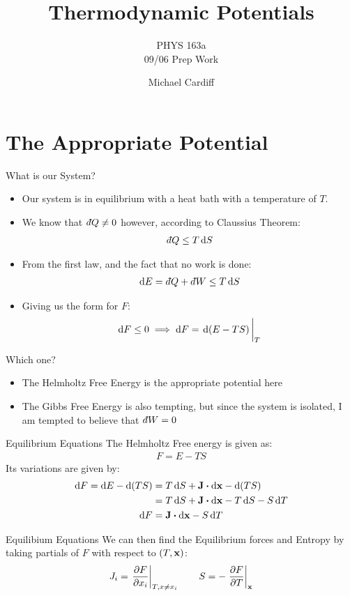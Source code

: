 \documentclass{beamer}
\title{Thermodynamic Potentials}
\author{Michael Cardiff}
\subtitle{PHYS 163a \\ 09/06 Prep Work}
\newcommand{\dbar}{d\hspace*{-0.08em}\bar{}\hspace*{0.1em}}
\begin{document}
\begin{frame}
  \titlepage
\end{frame}

\section{The Appropriate Potential}
\begin{frame}{What is our System?}
  \begin{itemize}
  \item Our system is in equilibrium with a heat bath with a temperature of $T$. 
  \item We know that $\dbar Q\neq0$ however, according to Claussius Theorem:
    \begin{align*}
      \dbar Q\leq T\dd{S}
    \end{align*}
  \item From the first law, and the fact that no work is done:
    \begin{align*}
      \dd{E}=\dbar Q+\dbar W\leq T\dd{S}
    \end{align*}
  \item Giving us the form for $F$:
    \begin{align*}
      \dd{F}\leq 0\implies \dd{F}=\eval{\dd{(E-TS)}}_{T}
    \end{align*}
  \end{itemize}
\end{frame}

\begin{frame}{Which one?}
  \begin{itemize}
  \item The Helmholtz Free Energy is the appropriate potential here
  \item The Gibbs Free Energy is also tempting, but since the system is isolated, I am tempted to believe that $\dbar W=0$
  \end{itemize}
\end{frame}

\begin{frame}{Equilibrium Equations}
  The Helmholtz Free energy is given as:
  \begin{align*}
    F=E-TS
  \end{align*}
  Its variations are given by:
  \begin{align*}
    \dd{F}=\dd{E}-\dd{(TS)}&=T\dd{S}+\vb{J}\vdot\dd{\vb{x}}-\dd{(TS)}\\
    &=T\dd{S}+\vb{J}\vdot\dd{\vb{x}}-T\dd{S}-S\dd{T}\\
    \dd{F}&=\vb{J}\vdot\dd{\vb{x}}-S\dd{T}
  \end{align*}
\end{frame}
\begin{frame}{Equilibium Equations}
  We can then find the Equilibrium forces and Entropy by taking partials of $F$ with respect to $(T,\vb{x})$:
  \begin{align*}
    J_i=\eval{\pdv{F}{x_i}}_{T,x\neq x_i}\qquad S=-\eval{\pdv{F}{T}}_{\vb{x}}
  \end{align*}
\end{frame}
\end{document}
